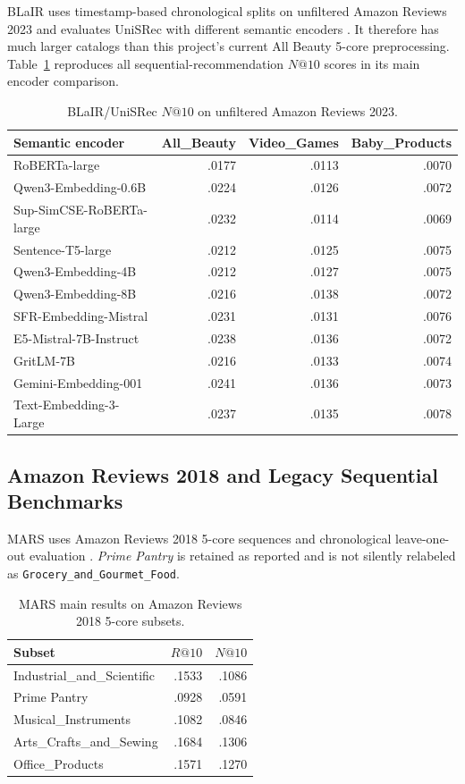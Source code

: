BLaIR uses timestamp-based chronological splits on unfiltered Amazon Reviews
2023 and evaluates UniSRec with different semantic encoders \cite{BLAIR}. It
therefore has much larger catalogs than this project's current All Beauty
5-core preprocessing. Table~\ref{tab:blair-amazon23} reproduces all
sequential-recommendation $N@10$ scores in its main encoder comparison.

\begin{table}[H]
\centering
\caption{BLaIR/UniSRec $N@10$ on unfiltered Amazon Reviews 2023.}
\label{tab:blair-amazon23}
\footnotesize
\begin{tabular}{@{}lrrr@{}}
\toprule
Semantic encoder & All\_Beauty & Video\_Games & Baby\_Products \\
\midrule
RoBERTa-large & .0177 & .0113 & .0070 \\
Qwen3-Embedding-0.6B & .0224 & .0126 & .0072 \\
Sup-SimCSE-RoBERTa-large & .0232 & .0114 & .0069 \\
Sentence-T5-large & .0212 & .0125 & .0075 \\
Qwen3-Embedding-4B & .0212 & .0127 & .0075 \\
Qwen3-Embedding-8B & .0216 & .0138 & .0072 \\
SFR-Embedding-Mistral & .0231 & .0131 & .0076 \\
E5-Mistral-7B-Instruct & .0238 & .0136 & .0072 \\
GritLM-7B & .0216 & .0133 & .0074 \\
Gemini-Embedding-001 & .0241 & .0136 & .0073 \\
Text-Embedding-3-Large & .0237 & .0135 & .0078 \\
\bottomrule
\end{tabular}
\end{table}

\subsection{Amazon Reviews 2018 and Legacy Sequential Benchmarks}

MARS uses Amazon Reviews 2018 5-core sequences and chronological leave-one-out
evaluation \cite{MARS}. \emph{Prime Pantry} is retained as reported and is not
silently relabeled as \texttt{Grocery\_and\_Gourmet\_Food}.

\begin{table}[H]
\centering
\caption{MARS main results on Amazon Reviews 2018 5-core subsets.}
\label{tab:mars-amazon18}
\begin{tabular}{@{}lrr@{}}
\toprule
Subset & $R@10$ & $N@10$ \\
\midrule
Industrial\_and\_Scientific & .1533 & .1086 \\
Prime Pantry & .0928 & .0591 \\
Musical\_Instruments & .1082 & .0846 \\
Arts\_Crafts\_and\_Sewing & .1684 & .1306 \\
Office\_Products & .1571 & .1270 \\
\bottomrule
\end{tabular}
\end{table}

